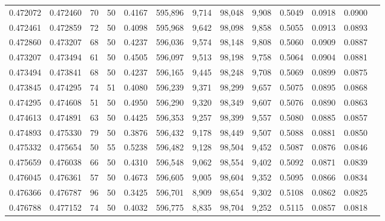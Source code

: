 \begin{tabular}{rrrrrrrrrrrrr}
0.472072 & 0.472460 &    70 &  50 &                                     0.4167 & 595,896 &   9,714 &  98,048 &   9,908 & 0.5049 & 0.0918 & 0.0900 \\
0.472461 & 0.472859 &    72 &  50 &                                     0.4098 & 595,968 &   9,642 &  98,098 &   9,858 & 0.5055 & 0.0913 & 0.0893 \\
0.472860 & 0.473207 &    68 &  50 &                                     0.4237 & 596,036 &   9,574 &  98,148 &   9,808 & 0.5060 & 0.0909 & 0.0887 \\
0.473207 & 0.473494 &    61 &  50 &                                     0.4505 & 596,097 &   9,513 &  98,198 &   9,758 & 0.5064 & 0.0904 & 0.0881 \\
0.473494 & 0.473841 &    68 &  50 &                                     0.4237 & 596,165 &   9,445 &  98,248 &   9,708 & 0.5069 & 0.0899 & 0.0875 \\
0.473845 & 0.474295 &    74 &  51 &                                     0.4080 & 596,239 &   9,371 &  98,299 &   9,657 & 0.5075 & 0.0895 & 0.0868 \\
0.474295 & 0.474608 &    51 &  50 &                                     0.4950 & 596,290 &   9,320 &  98,349 &   9,607 & 0.5076 & 0.0890 & 0.0863 \\
0.474613 & 0.474891 &    63 &  50 &                                     0.4425 & 596,353 &   9,257 &  98,399 &   9,557 & 0.5080 & 0.0885 & 0.0857 \\
0.474893 & 0.475330 &    79 &  50 &                                     0.3876 & 596,432 &   9,178 &  98,449 &   9,507 & 0.5088 & 0.0881 & 0.0850 \\
0.475332 & 0.475654 &    50 &  55 &                                     0.5238 & 596,482 &   9,128 &  98,504 &   9,452 & 0.5087 & 0.0876 & 0.0846 \\
0.475659 & 0.476038 &    66 &  50 &                                     0.4310 & 596,548 &   9,062 &  98,554 &   9,402 & 0.5092 & 0.0871 & 0.0839 \\
0.476045 & 0.476361 &    57 &  50 &                                     0.4673 & 596,605 &   9,005 &  98,604 &   9,352 & 0.5095 & 0.0866 & 0.0834 \\
0.476366 & 0.476787 &    96 &  50 &                                     0.3425 & 596,701 &   8,909 &  98,654 &   9,302 & 0.5108 & 0.0862 & 0.0825 \\
0.476788 & 0.477152 &    74 &  50 &                                     0.4032 & 596,775 &   8,835 &  98,704 &   9,252 & 0.5115 & 0.0857 & 0.0818 \\

\end{tabular}
